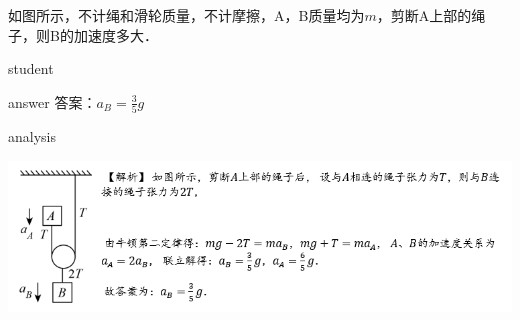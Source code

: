 \begin{example}
	如图所示，不计绳和滑轮质量，不计摩擦，A，B质量均为$ m $，剪断A上部的绳子，则B的加速度多大．
	
	\begin{taggedblock}{student}
		\vspace*{2cm}
	\end{taggedblock}
	
	
	\begin{taggedblock}{answer}
		答案：$ a_B = \frac{3}{5}g $
	\end{taggedblock}
	
	
	\begin{taggedblock}{analysis}
		\begin{center}
			\includegraphics[width=0.9\linewidth]{image/newton-11}
		\end{center}
	\end{taggedblock}
\end{example}


